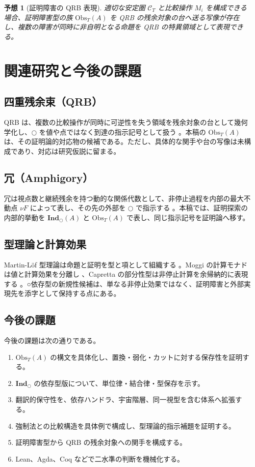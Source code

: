 \documentclass[a4paper,11pt]{ltjsarticle}
\theoremstyle{definition}
\theoremstyle{plain}
\newtheorem{conjecture}[definition]{予想}
\newcommand{\dfix}{\bigcirc}
\newcommand{\Obs}{\mathrm{Obs}}
\newcommand{\Ind}{\mathbf{Ind}_{\dfix}}
\begin{document}
\begin{conjecture}[証明障害の QRB 表現]
適切な安定圏 $\mathcal{C}_T$ と比較操作 $M_i$ を構成できる場合、証明障害型の族 $\Obs_T(A)$ を QRB の残余対象の台へ送る写像が存在し、複数の障害が同時に非自明となる命題を QRB の特異領域として表現できる。
\end{conjecture}

\section{関連研究と今後の課題}

\subsection{四重残余束（QRB）}

QRB は、複数の比較操作が同時に可逆性を失う領域を残余対象の台として幾何学化し、$\dfix$ を値や点ではなく到達の指示記号として扱う \cite{ChibaQRB2026}。本稿の $\Obs_T(A)$ は、その証明論的対応物の候補である。ただし、具体的な関手や台の写像は未構成であり、対応は研究仮説に留まる。

\subsection{冗（Amphigory）}

冗は視点数と継続残余を持つ動的な関係代数として、非停止過程を内部の最大不動点 $\nu F$ によって表し、その先の外部を $\dfix$ で指示する \cite{ChibaAmphigory2026}。本稿では、証明探索の内部的挙動を $\Ind(A)$ と $\Obs_T(A)$ で表し、同じ指示記号を証明論へ移す。

\subsection{型理論と計算効果}

Martin-Löf 型理論は命題と証明を型と項として組織する \cite{MartinLof1984}。Moggi の計算モナドは値と計算効果を分離し \cite{Moggi1991}、Capretta の部分性型は非停止計算を余帰納的に表現する \cite{Capretta2005}。○依存型の新規性候補は、単なる非停止効果ではなく、証明障害と外部実現先を添字として保持する点にある。

\subsection{今後の課題}

今後の課題は次の通りである。
\begin{enumerate}
 \item $\Obs_T(A)$ の構文を具体化し、置換・弱化・カットに対する保存性を証明する。
 \item $\Ind$ の依存型版について、単位律・結合律・型保存を示す。
 \item 翻訳的保守性を、依存ハンドラ、宇宙階層、同一視型を含む体系へ拡張する。
 \item 強制法との比較構造を具体例で構成し、型理論的指示補題を証明する。
 \item 証明障害型から QRB の残余対象への関手を構成する。
 \item Lean、Agda、Coq などで二水準の判断を機械化する。
\end{enumerate}
\end{document}
